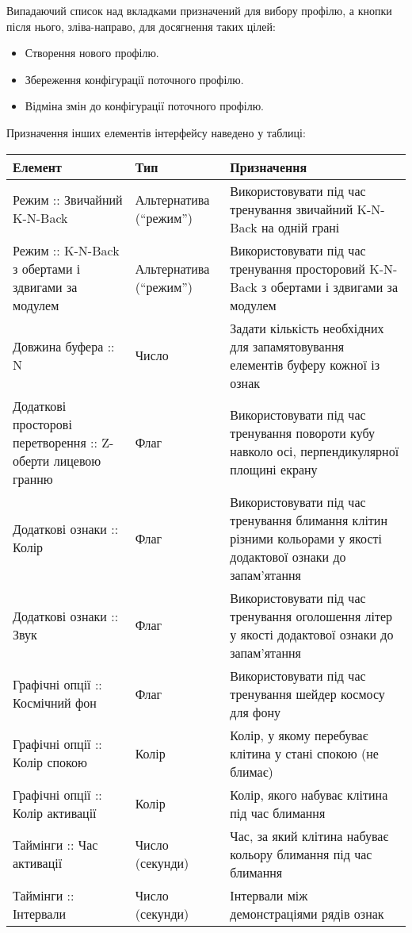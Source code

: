 Випадаючий список над вкладками призначений для вибору профілю, а кнопки після нього, зліва-направо, для досягнення таких цілей:
\begin{itemize}
  \item Створення нового профілю.
  \item Збереження конфігурації поточного профілю.
  \item Відміна змін до конфігурації поточного профілю.
\end{itemize}
\newpage
Призначення інших елементів інтерфейсу наведено у таблиці:
\small\begin{longtable}{| C{6cm} | C{3cm} | C{6cm} |}
  \hline
  Елемент & Тип & Призначення \\
  \hline
  Режим :: Звичайний K-N-Back
  & Альтернатива (``режим'')
  & Використовувати під час тренування звичайний K-N-Back на одній грані \\
  \hline
  Режим :: K-N-Back з обертами і здвигами за модулем
  & Альтернатива (``режим'')
  & Використовувати під час тренування просторовий K-N-Back
  з обертами і здвигами за модулем \\
  \hline
  Довжина буфера :: N
  & Число
  & Задати кількість необхідних для запамятовування
  елементів буферу кожної із ознак \\
  \hline
  Додаткові просторові перетворення :: Z-оберти лицевою гранню
  & Флаг
  & Використовувати під час тренування повороти кубу навколо осі,
  перпендикулярної площині екрану \\
  \hline
  Додаткові ознаки :: Колір
  & Флаг
  & Використовувати під час тренування блимання клітин різними кольорами
  у якості додактової ознаки до запам'ятання \\
  \hline
  Додаткові ознаки :: Звук
  & Флаг
  & Використовувати під час тренування оголошення літер
  у якості додактової ознаки до запам'ятання \\
  \hline
  Графічні опції :: Космічний фон
  & Флаг
  & Використовувати під час тренування шейдер космосу для фону \\
  \hline
  Графічні опції :: Колір спокою
  & Колір
  & Колір, у якому перебуває клітина у стані спокою (не блимає)\\
  \hline
  Графічні опції :: Колір активації
  & Колір
  & Колір, якого набуває клітина під час блимання \\
  \hline
  Таймінги :: Час активації
  & Число (секунди)
  & Час, за який клітина набуває кольору блимання під час блимання \\
  \hline
  Таймінги :: Інтервали
  & Число (секунди)
  & Інтервали між демонстраціями рядів ознак \\
  \hline
\end{longtable}\normalsize
